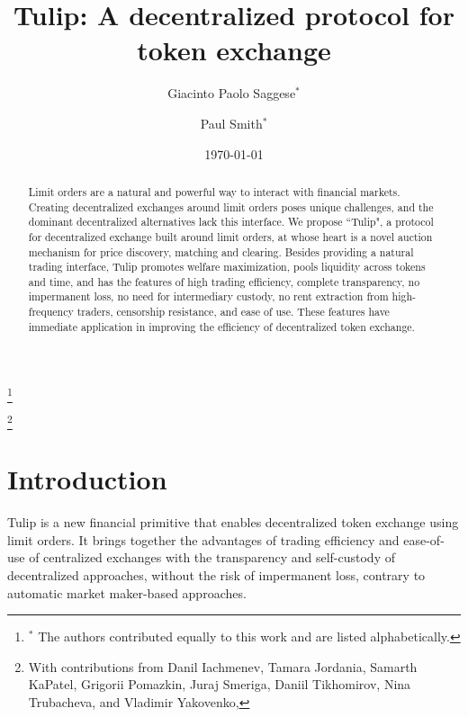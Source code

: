 \documentclass[11pt, reqno]{amsart}
\theoremstyle{definition}
\theoremstyle{remark}
\begin{document}
\title{Tulip: A decentralized protocol for token exchange}

\author{Giacinto Paolo Saggese$^{*}$}
\author{Paul Smith$^{*}$}
\thanks{$^{*}$ The authors contributed equally to this work and are listed alphabetically.}

\thanks{With contributions from
    Danil Iachmenev,
    Tamara Jordania,
    Samarth KaPatel,
    Grigorii Pomazkin,
    Juraj Smeriga,
    Daniil Tikhomirov,
    Nina Trubacheva,
    and
    Vladimir Yakovenko,
}

\date{\today}

\begin{abstract}
Limit orders are a natural and powerful way to interact with financial markets.
Creating decentralized exchanges around limit orders poses unique challenges,
and the dominant decentralized alternatives lack this interface.
We propose ``Tulip", a protocol for decentralized exchange built around limit
orders, at whose heart is a novel auction mechanism for price discovery,
matching and clearing. Besides providing a natural trading interface, Tulip
promotes welfare maximization, pools liquidity across tokens and time,
and has the features of high trading efficiency, complete transparency,
no impermanent loss, no need for intermediary custody, no rent extraction from
high-frequency traders, censorship resistance, and ease of use. These features
have immediate application in improving the efficiency of decentralized token
exchange.
\end{abstract}

\maketitle

\setcounter{tocdepth}{1}
\tableofcontents


\section{Introduction}

Tulip is a new financial primitive that enables decentralized token
exchange using limit orders. It brings together the advantages of trading
efficiency and ease-of-use of centralized exchanges with the transparency and
self-custody of decentralized approaches, without the risk of impermanent loss,
contrary to automatic market maker-based approaches.
\end{document}
